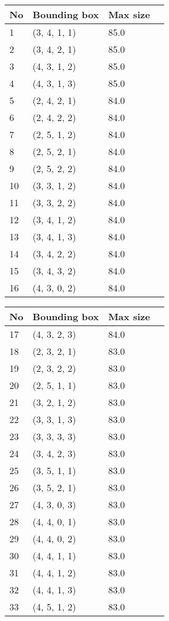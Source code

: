 %
    \begin{tabular}{|l|l|l|l|}
    \hline
    No &  Bounding box &  Max size  \\
    \hline%
    
1&(3, 4, 1, 1)& 85.0\\
2&(3, 4, 2, 1)& 85.0\\
3&(4, 3, 1, 2)& 85.0\\
4&(4, 3, 1, 3)& 85.0\\
5&(2, 4, 2, 1)& 84.0\\
6&(2, 4, 2, 2)& 84.0\\
7&(2, 5, 1, 2)& 84.0\\
8&(2, 5, 2, 1)& 84.0\\
9&(2, 5, 2, 2)& 84.0\\
10&(3, 3, 1, 2)& 84.0\\
11&(3, 3, 2, 2)& 84.0\\
12&(3, 4, 1, 2)& 84.0\\
13&(3, 4, 1, 3)& 84.0\\
14&(3, 4, 2, 2)& 84.0\\
15&(3, 4, 3, 2)& 84.0\\
16&(4, 3, 0, 2)& 84.0\\
%
    \hline
    \end{tabular}%
\hspace*{5mm}
%
    \begin{tabular}{|l|l|l|l|}
    \hline
    No &  Bounding box &  Max size  \\
    \hline%
    
17&(4, 3, 2, 3)& 84.0\\
18&(2, 3, 2, 1)& 83.0\\
19&(2, 3, 2, 2)& 83.0\\
20&(2, 5, 1, 1)& 83.0\\
21&(3, 2, 1, 2)& 83.0\\
22&(3, 3, 1, 3)& 83.0\\
23&(3, 3, 3, 3)& 83.0\\
24&(3, 4, 2, 3)& 83.0\\
25&(3, 5, 1, 1)& 83.0\\
26&(3, 5, 2, 1)& 83.0\\
27&(4, 3, 0, 3)& 83.0\\
28&(4, 4, 0, 1)& 83.0\\
29&(4, 4, 0, 2)& 83.0\\
30&(4, 4, 1, 1)& 83.0\\
31&(4, 4, 1, 2)& 83.0\\
32&(4, 4, 1, 3)& 83.0\\
33&(4, 5, 1, 2)& 83.0\\
%
    \hline
    \end{tabular}%
